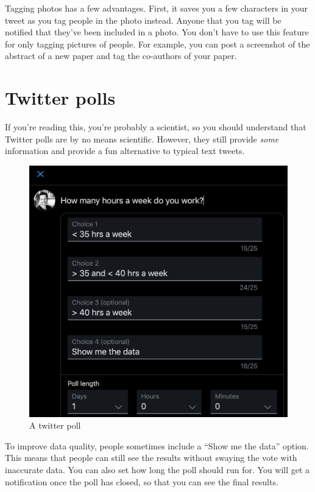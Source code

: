 \documentclass[
]{book}
\begin{document}
Tagging photos has a few advantages. First, it saves you a few characters in your tweet as you tag people in the photo instead. Anyone that you tag will be notified that they've been included in a photo. You don't have to use this feature for only tagging pictures of people. For example, you can post a screenshot of the abstract of a new paper and tag the co-authors of your paper.

\hypertarget{twitter-polls}{%
\section*{Twitter polls}\label{twitter-polls}}

If you're reading this, you're probably a scientist, so you should understand that Twitter polls are by no means scientific. However, they still provide \emph{some} information and provide a fun alternative to typical text tweets.

\begin{figure}

{\centering \includegraphics[width=0.8\linewidth]{images/poll} 

}

\caption{A twitter poll}\label{fig:unnamed-chunk-13}
\end{figure}

To improve data quality, people sometimes include a ``Show me the data'' option. This means that people can still see the results without swaying the vote with inaccurate data. You can also set how long the poll should run for. You will get a notification once the poll has closed, so that you can see the final results.
\end{document}
